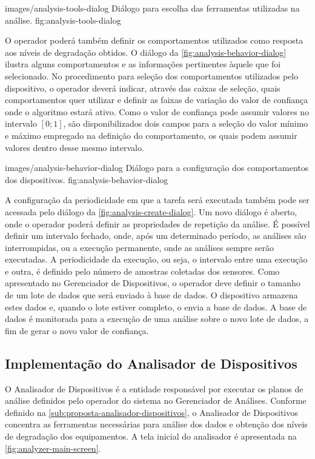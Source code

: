   {images/analysis-tools-dialog}
  {Diálogo para escolha das ferramentas utilizadas na análise.}
  {fig:analysis-tools-dialog}

O operador poderá também definir os comportamentos utilizados como resposta aos níveis de degradação
obtidos. O diálogo da \cref{fig:analysis-behavior-dialog} ilustra alguns comportamentos e as
informações pertinentes àquele que foi selecionado. No procedimento para seleção dos comportamentos
utilizados pelo dispositivo, o operador deverá indicar, através das caixas de seleção, quais
comportamentos quer utilizar e definir as faixas de variação do valor de confiança onde o algoritmo
estará ativo. Como o valor de confiança pode assumir valores no intervalo ${[0; 1]}$, são
disponibilizados dois campos para a seleção do valor mínimo e máximo empregado na definição do
comportamento, os quais podem assumir valores dentro desse mesmo intervalo.

  {images/analysis-behavior-dialog}
  {Diálogo para a configuração dos comportamentos dos dispositivos.}
  {fig:analysis-behavior-dialog}

A configuração da periodicidade em que a tarefa será executada também pode ser acessada pelo diálogo
da \cref{fig:analysis-create-dialog}. Um novo diálogo é aberto, onde o operador poderá definir as
propriedades de repetição da análise. É possível definir um intervalo fechado, onde, após um
determinado período, as análises são interrompidas, ou a execução permanente, onde as análises
sempre serão executadas. A periodicidade da execução, ou seja, o intervalo entre uma execução e
outra, é definido pelo número de amostras coletadas dos sensores. Como apresentado no Gerenciador de
Dispositivos, o operador deve definir o tamanho de um lote de dados que será enviado à base de
dados. O dispositivo armazena estes dados e, quando o lote estiver completo, o envia a base de
dados. A base de dados é monitorada para a execução de uma análise sobre o novo lote de dados, a fim
de gerar o novo valor de confiança.


\subsection{Implementação do Analisador de Dispositivos}

O Analisador de Dispositivos é a entidade responsável por executar os planos de análise definidos
pelo operador do sistema no Gerenciador de Análises. Conforme definido na
\cref{sub:proposta-analisador-dispositivos}, o Analisador de Dispositivos concentra as ferramentas
necessárias para análise dos dados e obtenção dos níveis de degradação dos equipamentos. A tela
inicial do analisador é apresentada na \cref{fig:analyzer-main-screen}.

